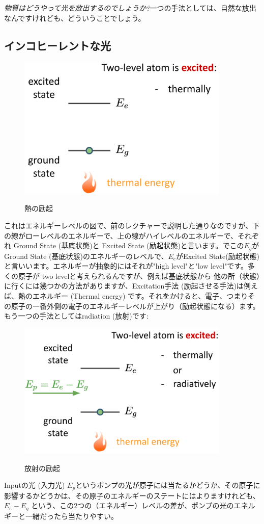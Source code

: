 \textit{物質はどうやって光を放出するのでしょうか?}一つの手法としては、自然な放出なんですけれども、どういうことでしょう。
\subsection{インコヒーレントな光}
\begin{figure}[H]
    \centering
    \includegraphics[width=0.9\textwidth]{lesson5/thermal.pdf}
    \label{図: 1}
    \caption{熱の励起}
\end{figure}
これはエネルギーレベルの図で、前のレクチャーで説明した通りなのですが、下の線がローレベルのエネルギーで、上の線がハイレベルのエネルギーで、それぞれ
Ground State (基底状態)と Excited State (励起状態)と言います。でこの$E_g$がGround State (基底状態)のエネルギーのレベルで、$E_e$がExcited State(励起状態)と言いいます。エネルギーが抽象的にはそれが"high level"と"low level"です。多くの原子が two levelと考えられるんですが、例えば基底状態から
他の所（状態）に行くには幾つかの方法がありますが、Excitation手法 (励起させる手法)は例えば、熱のエネルギー (Thermal energy) です。それをかけると、電子、つまりその原子の一番外側の電子のエネルギーレベルが上がり（励起状態になる）ます。もう一つの手法としてはradiation (放射)です:
\begin{figure}[H]
    \centering
    \includegraphics[width=0.9\textwidth]{lesson5/radioactive.pdf}
    \label{図: 1}
    \caption{放射の励起}
\end{figure}
Inputの光 (入力光) $E_p$というポンプの光が原子には当たるかどうか、その原子に影響するかどうかは、その原子のエネルギーのステートにはよりますけれども、$E_e-E_g$ という、この2つの（エネルギー）レベルの差が、ポンプの光のエネルギーと一緒だったら当たりやすい。

